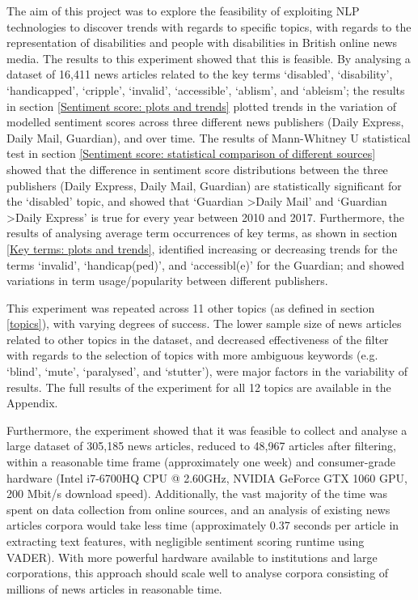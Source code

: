 \documentclass{report}
\begin{document}
The aim of this project was to explore the feasibility of exploiting NLP technologies to discover trends with regards to specific topics, with regards to the representation of disabilities and people with disabilities in British online news media.
The results to this experiment showed that this is feasible.
By analysing a dataset of 16,411 news articles related to the key terms `disabled', `disability', `handicapped', `cripple', `invalid', `accessible', `ablism', and `ableism'; the results in section \ref{Sentiment score: plots and trends} plotted trends in the variation of modelled sentiment scores across three different news publishers (Daily Express, Daily Mail, Guardian), and over time.
The results of Mann-Whitney U statistical test in section \ref{Sentiment score: statistical comparison of different sources} showed that the difference in sentiment score distributions between the three publishers (Daily Express, Daily Mail, Guardian) are statistically significant for the `disabled' topic, and showed that `Guardian \textgreater\space Daily Mail' and `Guardian \textgreater\space Daily Express' is true for every year between 2010 and 2017.
Furthermore, the results of analysing average term occurrences of key terms, as shown in section \ref{Key terms: plots and trends}, identified increasing or decreasing trends for the terms `invalid', `handicap(ped)', and `accessibl(e)' for the Guardian; and showed variations in term usage/popularity between different publishers.

This experiment was repeated across 11 other topics (as defined in section \ref{topics}), with varying degrees of success. 
The lower sample size of news articles related to other topics in the dataset, and decreased effectiveness of the filter with regards to the selection of topics with more ambiguous keywords (e.g. `blind', `mute', `paralysed', and `stutter'), were major factors in the variability of results.
The full results of the experiment for all 12 topics are available in the Appendix.
 
Furthermore, the experiment showed that it was feasible to collect and analyse a large dataset of 305,185 news articles, reduced to 48,967 articles after filtering, within a reasonable time frame (approximately one week) and consumer-grade hardware (Intel i7-6700HQ CPU @ 2.60GHz, NVIDIA GeForce GTX 1060 GPU, 200 Mbit/s download speed).
Additionally, the vast majority of the time was spent on data collection from online sources, and an analysis of existing news articles corpora would take less time (approximately 0.37 seconds per article in extracting text features, with negligible sentiment scoring runtime using VADER).
With more powerful hardware available to institutions and large corporations, this approach should scale well to analyse corpora consisting of millions of news articles in reasonable time.
\end{document}
